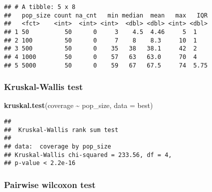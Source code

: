 \documentclass[
]{book}
\newenvironment{Shaded}{\begin{snugshade}}{\end{snugshade}}
\newcommand{\AttributeTok}[1]{\textcolor[rgb]{0.13,0.29,0.53}{#1}}
\newcommand{\ConstantTok}[1]{\textcolor[rgb]{0.56,0.35,0.01}{#1}}
\newcommand{\FunctionTok}[1]{\textcolor[rgb]{0.13,0.29,0.53}{\textbf{#1}}}
\newcommand{\NormalTok}[1]{#1}
\newcommand{\SpecialCharTok}[1]{\textcolor[rgb]{0.81,0.36,0.00}{\textbf{#1}}}
\newcommand{\StringTok}[1]{\textcolor[rgb]{0.31,0.60,0.02}{#1}}
\begin{document}
\begin{verbatim}
## # A tibble: 5 x 8
##   pop_size count na_cnt   min median  mean   max   IQR
##   <fct>    <int>  <int> <int>  <dbl> <dbl> <int> <dbl>
## 1 50          50      0     3    4.5  4.46     5  1   
## 2 100         50      0     7    8    8.3     10  1   
## 3 500         50      0    35   38   38.1     42  2   
## 4 1000        50      0    57   63   63.0     70  4   
## 5 5000        50      0    59   67   67.5     74  5.75
\end{verbatim}

\hypertarget{kruskal-wallis-test-5}{%
\subsubsection{Kruskal-Wallis test}\label{kruskal-wallis-test-5}}

\begin{Shaded}
\begin{Highlighting}[]
\FunctionTok{kruskal.test}\NormalTok{(coverage }\SpecialCharTok{\textasciitilde{}}\NormalTok{ pop\_size, }\AttributeTok{data =}\NormalTok{ best)}
\end{Highlighting}
\end{Shaded}

\begin{verbatim}
## 
##  Kruskal-Wallis rank sum test
## 
## data:  coverage by pop_size
## Kruskal-Wallis chi-squared = 233.56, df = 4,
## p-value < 2.2e-16
\end{verbatim}

\hypertarget{pairwise-wilcoxon-test-5}{%
\subsubsection{Pairwise wilcoxon test}\label{pairwise-wilcoxon-test-5}}

\begin{Shaded}
\end{Shaded}
\end{document}

